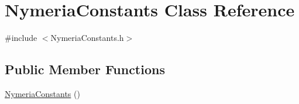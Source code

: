 \hypertarget{classNymeriaConstants}{\section{\-Nymeria\-Constants \-Class \-Reference}
\label{classNymeriaConstants}
}


{\ttfamily \#include $<$\-Nymeria\-Constants.\-h$>$}

\subsection*{\-Public \-Member \-Functions}
\begin{DoxyCompactItemize}
\item 
\hyperlink{classNymeriaConstants_aea06abeba1780d187a74d75b9313e2c4}{\-Nymeria\-Constants} ()
\end{DoxyCompactItemize}

